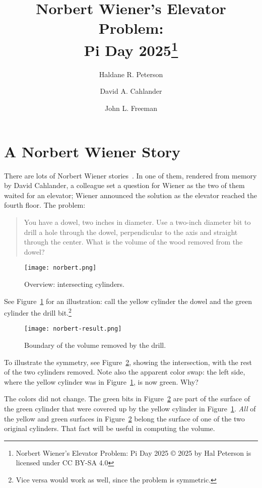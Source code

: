 \documentclass[twocolumn]{article}
\title{Norbert Wiener's Elevator Problem: \\
  Pi Day 2025\footnote{Norbert Wiener's Elevator Problem: Pi Day 2025
  © 2025 by Hal Peterson is licensed under CC BY-SA 4.0}}
\author{Haldane R. Peterson \and
  David A. Cahlander \and
  John L. Freeman}
\theoremstyle{definition}
\theoremstyle{plain}
\begin{document}
\maketitle

\section{A Norbert Wiener Story}

There are lots of Norbert Wiener stories~\cite{Hardesty2021}.  In one
of them, rendered from memory by David Cahlander, a colleague
set a question for Wiener as the two of them waited for an elevator;
Wiener announced the solution as the elevator reached the fourth
floor.  The problem:
\begin{quotation}
  You have a dowel, two inches in diameter.  Use a two-inch diameter
  bit to drill a hole through the dowel, perpendicular to the axis and
  straight through the center.  What is the volume of the wood removed
  from the dowel?
\end{quotation}

\begin{figure}
  \texttt{[image: norbert.png]}
  \caption{Overview:  intersecting cylinders.}
  \label{fig:overview}
\end{figure}

See Figure~\ref{fig:overview} for an illustration:  call the yellow
cylinder the dowel and the green cylinder the drill bit.\footnote{Vice
versa would work as well, since the problem is symmetric.}

\begin{figure}
  \texttt{[image: norbert-result.png]}
  \caption{Boundary of the volume removed by the drill.}
  \label{fig:boundary}
\end{figure}

To illustrate the symmetry, see Figure~\ref{fig:boundary}, showing the
intersection, with the rest of the two cylinders removed.  Note
also the apparent color swap:  the left side, where the yellow
cylinder was in Figure~\ref{fig:overview}, is now green.  Why?

The colors did not change.  The green bits in
Figure~\ref{fig:boundary} are part of the surface of the green
cylinder that were covered up by the yellow cylinder in
Figure~\ref{fig:overview}.  \emph{All} of the yellow and green
surfaces in Figure~\ref{fig:boundary} belong the surface of one of the
two original cylinders.  That fact will be useful in computing the
volume.
\end{document}
